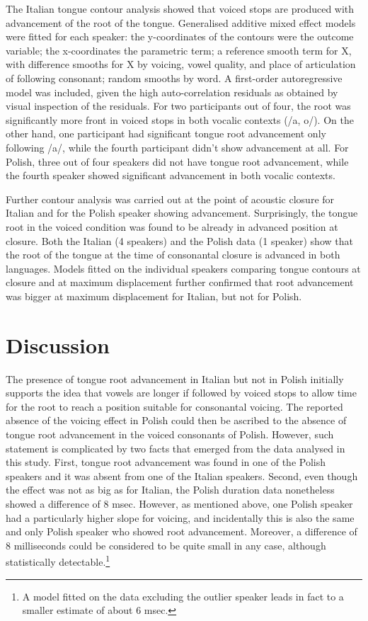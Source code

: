 \documentclass[]{elsarticle}
\begin{document}
The Italian tongue contour analysis showed that voiced stops are
produced with advancement of the root of the tongue. Generalised
additive mixed effect models were fitted for each speaker: the
y-coordinates of the contours were the outcome variable; the
x-coordinates the parametric term; a reference smooth term for X, with
difference smooths for X by voicing, vowel quality, and place of
articulation of following consonant; random smooths by word. A
first-order autoregressive model was included, given the high
auto-correlation residuals as obtained by visual inspection of the
residuals. For two participants out of four, the root was significantly
more front in voiced stops in both vocalic contexts (/a, o/). On the
other hand, one participant had significant tongue root advancement only
following /a/, while the fourth participant didn't show advancement at
all. For Polish, three out of four speakers did not have tongue root
advancement, while the fourth speaker showed significant advancement in
both vocalic contexts.

Further contour analysis was carried out at the point of acoustic
closure for Italian and for the Polish speaker showing advancement.
Surprisingly, the tongue root in the voiced condition was found to be
already in advanced position at closure. Both the Italian (4 speakers)
and the Polish data (1 speaker) show that the root of the tongue at the
time of consonantal closure is advanced in both languages. Models fitted
on the individual speakers comparing tongue contours at closure and at
maximum displacement further confirmed that root advancement was bigger
at maximum displacement for Italian, but not for Polish.

\section{Discussion}\label{discussion}

The presence of tongue root advancement in Italian but not in Polish
initially supports the idea that vowels are longer if followed by voiced
stops to allow time for the root to reach a position suitable for
consonantal voicing. The reported absence of the voicing effect in
Polish could then be ascribed to the absence of tongue root advancement
in the voiced consonants of Polish. However, such statement is
complicated by two facts that emerged from the data analysed in this
study. First, tongue root advancement was found in one of the Polish
speakers and it was absent from one of the Italian speakers. Second,
even though the effect was not as big as for Italian, the Polish
duration data nonetheless showed a difference of 8 msec. However, as
mentioned above, one Polish speaker had a particularly higher slope for
voicing, and incidentally this is also the same and only Polish speaker
who showed root advancement. Moreover, a difference of 8 milliseconds
could be considered to be quite small in any case, although
statistically
detectable.\footnote{A model fitted on the data excluding the outlier speaker leads in fact to a smaller estimate of about 6 msec.}
\end{document}
